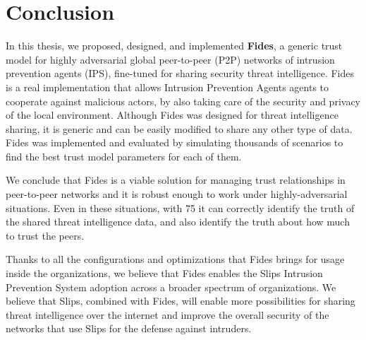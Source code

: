 \chapter{Conclusion}
\label{ch:conclusion}

In this thesis, we proposed, designed, and implemented \textbf{Fides}, a generic trust model for highly adversarial global peer-to-peer (P2P) networks of intrusion prevention agents (IPS), fine-tuned for sharing security threat intelligence. Fides is a real implementation that allows Intrusion Prevention Agents agents to cooperate against malicious actors, by also taking care of the security and privacy of the local environment. 
Although Fides was designed for threat intelligence sharing, it is generic and can be easily modified to share any other type of data. Fides was implemented and evaluated by simulating thousands of scenarios to find the best trust model parameters for each of them.

We conclude that Fides is a viable solution for managing trust relationships in peer-to-peer networks and it is robust enough to work under highly-adversarial situations. Even in these situations, with 75 it can correctly identify the truth of the shared threat intelligence data, and also identify the truth about how much to trust the peers.

Thanks to all the configurations and optimizations that Fides brings for usage inside the organizations, we believe that Fides enables the Slips Intrusion Prevention System adoption across a broader spectrum of organizations.
We believe that Slips, combined with Fides, will enable more possibilities for sharing threat intelligence over the internet and improve the overall security of the networks that use Slips for the defense against intruders.


